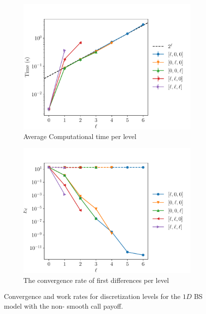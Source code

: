 \documentclass[11pt]{article}
\begin{document}
\begin{figure}[!h]
	\centering
	\begin{subfigure}{.5\textwidth}
		\centering
		\includegraphics[width=0.95\linewidth]{./figures/1D_BS_4_steps_non_smooth/level_work.pdf}
		\caption{Average Computational time per level}
		\label{fig:misc_1D_BS_non_smooth_4steps_sub3}
	\end{subfigure}%
	\begin{subfigure}{.5\textwidth}
		\centering
		\includegraphics[width=0.95\linewidth]{./figures/1D_BS_4_steps_non_smooth/levels_error_rate.pdf}
		\caption{ The convergence rate of first differences per level}
		\label{fig:misc_1D_BS_non_smooth_4steps_sub4}
	\end{subfigure}%
	\caption{Convergence and work rates for discretization levels for the $1D$ BS model with the non- smooth call payoff.}
	\label{fig:misc_1D_BS_4teps_2}
\end{figure}
\end{document}
